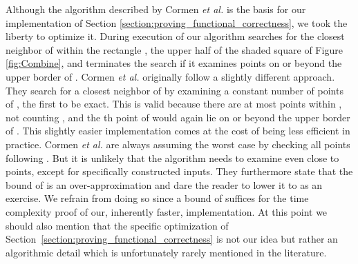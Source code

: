 \begin{isabellebody}
\begin{isamarkuptext}
Although the algorithm described by Cormen \emph{et al.} is the basis for our implementation of
Section \ref{section:proving_functional_correctness}, we took the liberty to
optimize it. During execution of  our algorithm
searches for the closest neighbor of  within the rectangle , the upper half of the shaded
square  of Figure \ref{fig:Combine}, and terminates the search if it examines points on or beyond
the upper border of . Cormen \emph{et al.} originally follow a slightly different approach. They
search for a closest neighbor of  by examining a constant number of points of , the first
 to be exact. This is valid because there are at most  points within , not
counting , and the th point of  would again lie on or beyond the upper border of .
This slightly easier implementation comes at the cost of being less efficient in practice.
Cormen \emph{et al.} are always assuming the worst case by checking all  points following .
But it is unlikely that the algorithm needs to examine even close to  points, except for specifically
constructed inputs. They furthermore state that the bound of  is an over-approximation
and dare the reader to lower it to  as an exercise. We refrain from doing so since a bound of
 suffices for the time complexity proof of our, inherently faster, implementation. At
this point we should also mention that the specific optimization of Section~\ref{section:proving_functional_correctness}
is not our idea but rather an algorithmic detail which is unfortunately rarely mentioned in the
literature.


\end{isamarkuptext}
\end{isabellebody}
